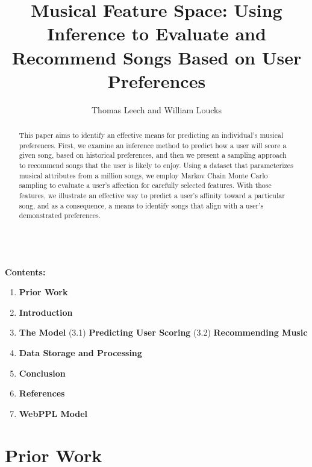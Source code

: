 \documentclass{amsart}
\theoremstyle{plain}
\theoremstyle{definition}
\begin{document}
   	
   	\title{ Musical Feature Space: Using Inference to Evaluate and Recommend Songs Based on User Preferences }
   	\author{ Thomas Leech and William Loucks }
   	
   	\begin{abstract}
   		This paper aims to identify an effective means for predicting an individual's musical preferences. First, we examine an inference method to predict how a user will score a given song, based on historical preferences, and then we present a sampling approach to recommend songs that the user is likely to enjoy. Using a dataset that parameterizes musical attributes from a million songs, we employ Markov Chain Monte Carlo sampling to evaluate a user's affection for carefully selected features. With those features, we illustrate an effective way to predict a user's affinity toward a particular song, and as a consequence, a means to identify songs that align with a user's demonstrated preferences.
   	\end{abstract}
   
   	\maketitle
   	
   	\noindent \hrulefill \ \\
	\noindent \textbf{Contents:}
   	\begin{enumerate}
   		\item \textbf{Prior Work}
   		\item \textbf{Introduction}
   		\item \textbf{The Model}
   		\subitem (3.1) \textbf{Predicting User Scoring}
   		\subitem (3.2) \textbf{Recommending Music}
   		\item \textbf{Data Storage and Processing}
   		\item \textbf{Conclusion}
   		\item \textbf{References}
   		\item \textbf{WebPPL Model}
   	\end{enumerate}
   \noindent \hrulefill

   	\section{Prior Work}
   	
\end{document}
